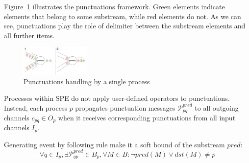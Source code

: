 Figure~\ref{punctuations_scheme} illustrates the punctuations framework. Green elements indicate elements that belong to some substream, while red elements do not. As we can see, punctuations play the role of delimiter between the substream elements and all further items.

\begin{figure}[htbp]
  \centering
  \includegraphics[width=0.30\textwidth]{pics/punctuations-scheme.pdf}
  \caption{Punctuations handling by a single process}
  \label{punctuations_scheme}
\end{figure}

Processes within SPE do not apply user-defined operators to punctuations. Instead, each process $p$ propagates punctuation messages $\mathcal{P}_{pq}^{pred}$ to all outgoing channels $c_{pq} \in O_p$  when it receives corresponding punctuations from all input channels $I_p$.

\begin{lemma}
Generating event by following rule make it a soft bound of the substream $pred$:
\begin{equation}
\forall q \in I_p, \exists \mathcal{P}^{pred}_{qp} \in B_p, \forall M\in B : \neg pred(M) \vee dst(M) \ne p
\end{equation}
\end{lemma}

